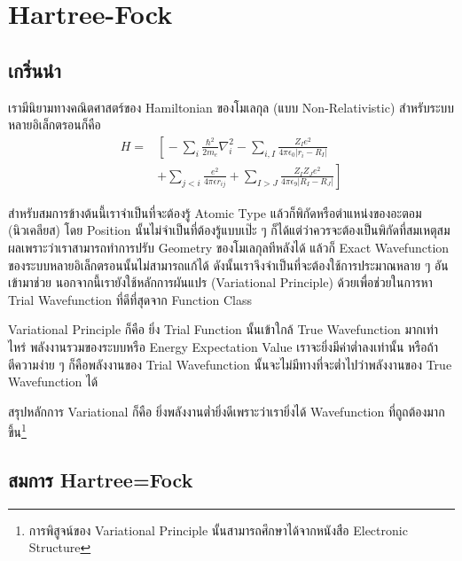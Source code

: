 
\chapter{Hartree-Fock}

\section{เกริ่นนำ}

เรามีนิยามทางคณิตศาสตร์ของ Hamiltonian ของโมเลกุล (แบบ Non-Relativistic) สำหรับระบบหลายอิเล็กตรอนก็คือ
%
\begin{equation}
    \begin{aligned}
        H = &
        \left[ \right.
        -\sum_{i} \frac{\hbar^{2}}{2m_{e}} \nabla^{2}_{i}
        -\sum_{i,I} \frac{Z_{I} e^{2}}{4\pi\epsilon_{0} |r_{i} - R_{I}|} \\
            & +\sum_{j<i} \frac{e^{2}}{4\pi\epsilon r_{ij}}
        +\sum_{I>J} \frac{Z_{I} Z_{J} e^{2}}{4\pi\epsilon_{9} |R_{I} - R_{J}|}
        \left. \right]
    \end{aligned}
\end{equation}

สำหรับสมการข้างต้นนี้เราจำเป็นที่จะต้องรู้ Atomic Type แล้วก็พิกัดหรือตำแหน่งของอะตอม (นิวเคลียส) โดย Position นั้นไม่จำเป็นที่ต้องรู้แบบเป๊ะ ๆ ก็ได้แต่ว่าควรจะต้องเป็นพิกัดที่สมเหตุสมผลเพราะว่าเราสามารถทำการปรับ Geometry ของโมเลกุลทีหลังได้ แล้วก็ Exact Wavefunction ของระบบหลายอิเล็กตรอนนั้นไม่สามารถแก้ได้ ดังนั้นเราจึงจำเป็นที่จะต้องใช้การประมาณหลาย ๆ อันเข้ามาช่วย นอกจากนี้เรายังใช้หลักการผันแปร (Variational Principle) ด้วยเพื่อช่วยในการหา Trial Wavefunction ที่ดีที่สุดจาก Function Class

Variational Principle ก็คือ ยิ่ง Trial Function นั้นเข้าใกล้ True Wavefunction มากเท่าไหร่ พลังงานรวมของระบบหรือ Energy Expectation Value เราจะยิ่งมีค่าต่ำลงเท่านั้น หรือถ้าตีความง่าย ๆ ก็คือพลังงานของ Trial Wavefunction นั้นจะไม่มีทางที่จะต่ำไปว่าพลังงานของ True Wavefunction ได้

สรุปหลักการ Variational ก็คือ ยิ่งพลังงานต่ำยิ่งดีเพราะว่าเรายิ่งได้ Wavefunction ที่ถูถต้องมากขึ้น\footnote{การพิสูจน์ของ Variational Principle นั้นสามารถศึกษาได้จากหนังสือ Electronic Structure}

\section{สมการ Hartree=Fock}

